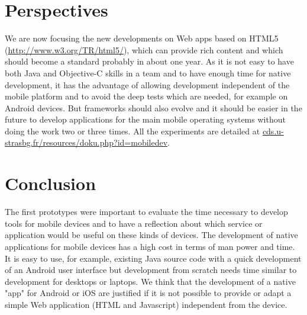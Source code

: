 \section{Perspectives}
We are now focusing the new developments on Web apps based on HTML5 (\url{http://www.w3.org/TR/html5/}), which can provide rich content and which should become a standard probably in about one year. As it is not easy to have both Java and Objective-C skills in a team and to have enough time for native development, it has the advantage of allowing development independent of the mobile platform and to avoid the deep tests which are needed, for example on Android devices. But frameworks should also evolve and it should be easier in the future to develop applications for the main mobile operating systems without doing the work two or three times. All the experiments are detailed at \url{cds.u-strasbg.fr/resources/doku.php?id=mobiledev}.

\section{Conclusion}
The first prototypes were important to evaluate the time necessary to develop tools for mobile devices and to have a reflection about which service or application would be useful on these kinds of devices. The development of native applications for mobile devices has a high cost in terms of man power and time. It is easy to use, for example, existing Java source code with a quick development of an Android user interface but development from scratch needs time similar to development for desktops or laptops. We think that the development of a native "app" for Android or iOS are justified if it is not possible to provide or adapt a simple Web application (HTML and Javascript) independent from the device.


